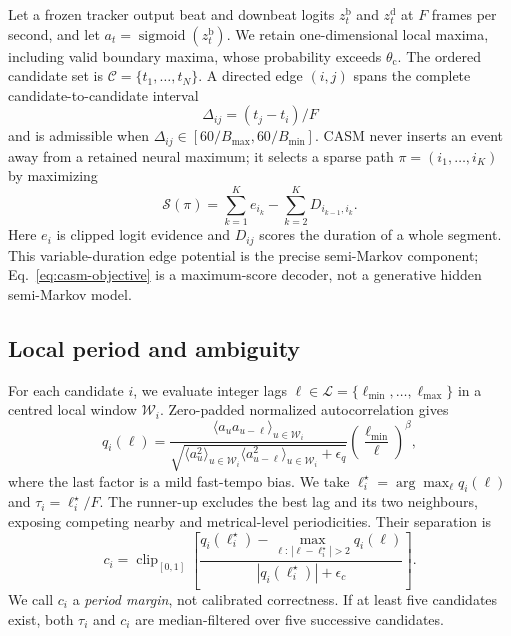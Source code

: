\documentclass{article}
\begin{document}
Let a frozen tracker output beat and downbeat logits
$z_t^{\mathrm b}$ and $z_t^{\mathrm d}$ at $F$ frames per second, and let
$a_t=\operatorname{sigmoid}(z_t^{\mathrm b})$. We retain one-dimensional
local maxima, including valid boundary maxima, whose probability exceeds
$\theta_{\mathrm c}$. The ordered candidate set is
$\mathcal C=\{t_1,\ldots,t_N\}$. A directed edge $(i,j)$ spans the complete
candidate-to-candidate interval
\[
  \Delta_{ij}=(t_j-t_i)/F
\]
and is admissible when
$\Delta_{ij}\in[60/B_{\max},60/B_{\min}]$. CASM never inserts an event away
from a retained neural maximum; it selects a sparse path
$\pi=(i_1,\ldots,i_K)$ by maximizing
\begin{equation}
  \mathcal S(\pi)=\sum_{k=1}^{K}e_{i_k}
  -\sum_{k=2}^{K}D_{i_{k-1},i_k}.
  \label{eq:casm-objective}
\end{equation}
Here $e_i$ is clipped logit evidence and $D_{ij}$ scores the duration of a
whole segment. This variable-duration edge potential is the precise
semi-Markov component; Eq.~\eqref{eq:casm-objective} is a maximum-score
decoder, not a generative hidden semi-Markov model.

\subsection{Local period and ambiguity}

For each candidate $i$, we evaluate integer lags
$\ell\in\mathcal L=\{\ell_{\min},\ldots,\ell_{\max}\}$ in a centred local
window $\mathcal W_i$. Zero-padded normalized autocorrelation gives
\begin{equation}
q_i(\ell)=
\frac{\langle a_u a_{u-\ell}\rangle_{u\in\mathcal W_i}}
{\sqrt{\langle a_u^2\rangle_{u\in\mathcal W_i}
       \langle a_{u-\ell}^2\rangle_{u\in\mathcal W_i}+\epsilon_q}}
\left(\frac{\ell_{\min}}{\ell}\right)^\beta ,
\label{eq:casm-period}
\end{equation}
where the last factor is a mild fast-tempo bias. We take
$\ell_i^\star=\arg\max_\ell q_i(\ell)$ and $\tau_i=\ell_i^\star/F$.
The runner-up excludes the best lag and its two neighbours, exposing
competing nearby and metrical-level periodicities. Their separation is
\begin{equation}
c_i=\operatorname{clip}_{[0,1]}
\left[
\frac{q_i(\ell_i^\star)-
\max_{\ell:\,|\ell-\ell_i^\star|>2}q_i(\ell)}
{|q_i(\ell_i^\star)|+\epsilon_c}
\right].
\label{eq:casm-ambiguity}
\end{equation}
We call $c_i$ a \emph{period margin}, not calibrated correctness. If at least
five candidates exist, both $\tau_i$ and $c_i$ are median-filtered over five
successive candidates.
\end{document}
